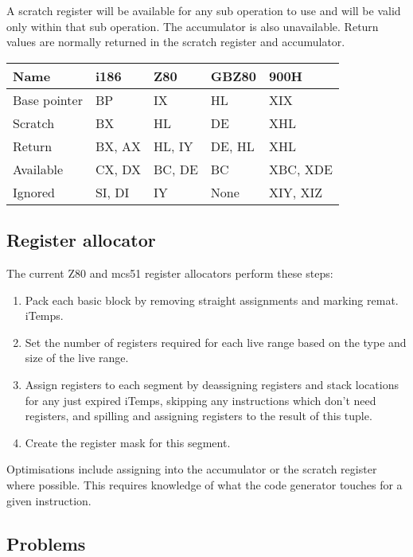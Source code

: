 \documentclass{article}
\begin{document}
A scratch register will be available for any sub operation to use and
will be valid only within that sub operation.  The accumulator is also
unavailable.  Return values are normally returned in the scratch
register and accumulator.

\begin{tabular}{l|l|l|l|l}
	Name		& i186	  & Z80	    & GBZ80  & 900H 	\\ \hline
	Base pointer 	& BP	  & IX	    & HL     & XIX 	\\ \hline
	Scratch		& BX	  & HL	    & DE     & XHL	\\ \hline
	Return		& BX, AX  & HL, IY  & DE, HL & XHL	\\ \hline
	Available	& CX, DX  & BC, DE  & BC     & XBC, XDE	\\ \hline
	Ignored		& SI, DI  & IY	    & None   & XIY, XIZ	\\
\end{tabular}

\subsection{Register allocator}
The current Z80 and mcs51 register allocators perform these steps:
\begin{enumerate}
	\item Pack each basic block by removing straight assignments and marking
remat. iTemps.
	\item Set the number of registers required for each live range based on
the type and size of the live range.
	\item Assign registers to each segment by deassigning registers and stack
locations for any just expired iTemps, skipping any instructions which don't need
registers, and spilling and assigning registers to the result of this tuple.
	\item Create the register mask for this segment.
\end{enumerate}

Optimisations include assigning into the accumulator or the scratch
register where possible.  This requires knowledge of what the code
generator touches for a given instruction.

\subsection{Problems}
\end{document}

